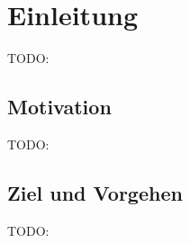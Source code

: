 \chapter{Einleitung}
\label{chapter:einleitung}

TODO:

\section{Motivation}
\label{chapter:motivation}

TODO:

\section{Ziel und Vorgehen}
\label{chapter:ziel-und-vorgehen}

TODO: